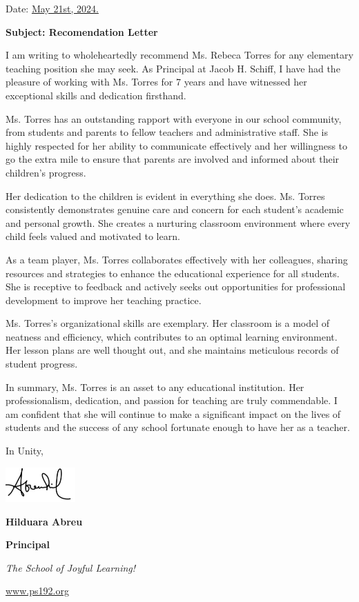 \documentclass[11pt,letterpaper]{article}
\begin{document}
\vspace*{0.5in}
Date: \href{https://www.ps192.org}{May 21st, 2024.} 

\textbf{Subject: Recomendation Letter}

I am writing to wholeheartedly recommend Ms. Rebeca Torres for any elementary teaching position she may seek. As Principal at Jacob H. Schiff, I have had the pleasure of working with Ms. Torres for 7 years and have witnessed her exceptional skills and dedication firsthand.

Ms. Torres has an outstanding rapport with everyone in our school community, from students and parents to fellow teachers and administrative staff. She is highly respected for her ability to communicate effectively and her willingness to go the extra mile to ensure that parents are involved and informed about their children's progress.

Her dedication to the children is evident in everything she does. Ms. Torres consistently demonstrates genuine care and concern for each student's academic and personal growth. She creates a nurturing classroom environment where every child feels valued and motivated to learn.

As a team player, Ms. Torres collaborates effectively with her colleagues, sharing resources and strategies to enhance the educational experience for all students. She is receptive to feedback and actively seeks out opportunities for professional development to improve her teaching practice.

Ms. Torres's organizational skills are exemplary. Her classroom is a model of neatness and efficiency, which contributes to an optimal learning environment. Her lesson plans are well thought out, and she maintains meticulous records of student progress.

In summary, Ms. Torres is an asset to any educational institution. Her professionalism, dedication, and passion for teaching are truly commendable. I am confident that she will continue to make a significant impact on the lives of students and the success of any school fortunate enough to have her as a teacher.

In Unity,

\includegraphics[width=0.2\textwidth]{hil_signature}

\textbf{Hilduara Abreu}

\textbf{Principal}

\textit{The School of Joyful Learning!}

\url{www.ps192.org}
\end{document}
